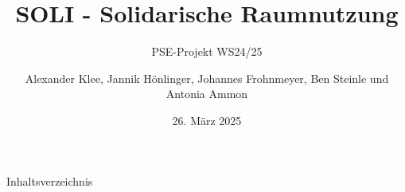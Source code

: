 \documentclass{sdqbeamer}
\title[Solidarische Raumnutzung Abschlusspräsentation]{SOLI - Solidarische Raumnutzung}
\subtitle{PSE-Projekt WS24/25}
\author[]{Alexander Klee, Jannik Hönlinger, Johannes Frohnmeyer, Ben Steinle und Antonia Ammon}
\date[26.\,3.\,2025]{26. März 2025}
\begin{document}
 
\KITtitleframe

\begin{frame}{Inhaltsverzeichnis}
\tableofcontents
\end{frame}






\end{document}
